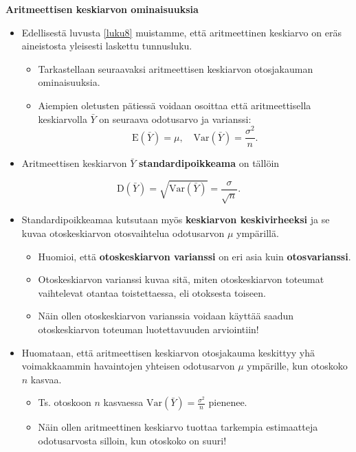 \documentclass[
]{book}
\providecommand{\tightlist}{%
  \setlength{\itemsep}{0pt}\setlength{\parskip}{0pt}}
\begin{document}
\textbf{Aritmeettisen keskiarvon ominaisuuksia}

\begin{itemize}
\tightlist
\item
  Edellisestä luvusta \ref{luku8} muistamme, että aritmeettinen keskiarvo on eräs aineistosta yleisesti laskettu tunnusluku.

  \begin{itemize}
  \tightlist
  \item
    Tarkastellaan seuraavaksi aritmeettisen keskiarvon otosjakauman ominaisuuksia.
  \item
    Aiempien oletusten pätiessä voidaan osoittaa että aritmeettisella keskiarvolla \(\bar{Y}\) on seuraava odotusarvo ja varianssi:
    \[
    \text{E}(\bar{Y}) = \mu,  \quad
    \mathrm{Var}(\bar{Y}) = \frac{\sigma^2}{n}.
    \]
  \end{itemize}
\item
  Aritmeettisen keskiarvon \(\bar{Y}\) \textbf{standardipoikkeama} on tällöin
\end{itemize}

\[
\text{D}(\bar{Y}) = \sqrt{\mathrm{Var}(\bar{Y})} = \frac{\sigma}{\sqrt{n}}.
\]

\begin{itemize}
\tightlist
\item
  Standardipoikkeamaa kutsutaan myös \textbf{keskiarvon keskivirheeksi} ja se kuvaa otoskeskiarvon otosvaihtelua odotusarvon \(\mu\) ympärillä.

  \begin{itemize}
  \tightlist
  \item
    Huomioi, että \textbf{otoskeskiarvon varianssi} on eri asia kuin \textbf{otosvarianssi}.
  \item
    Otoskeskiarvon varianssi kuvaa sitä, miten otoskeskiarvon toteumat vaihtelevat otantaa toistettaessa, eli otoksesta toiseen.
  \item
    Näin ollen otoskeskiarvon varianssia voidaan käyttää saadun otoskeskiarvon toteuman luotettavuuden arviointiin!
  \end{itemize}
\item
  Huomataan, että aritmeettisen keskiarvon otosjakauma keskittyy yhä voimakkaammin havaintojen yhteisen odotusarvon \(\mu\) ympärille, kun otoskoko \(n\) kasvaa.

  \begin{itemize}
  \tightlist
  \item
    Ts. otoskoon \(n\) kasvaessa \(\mathrm{Var}(\bar{Y}) = \frac{\sigma^2}{n}\) pienenee.
  \item
    Näin ollen aritmeettinen keskiarvo tuottaa tarkempia estimaatteja odotusarvosta silloin, kun otoskoko on suuri!
  \end{itemize}
\end{itemize}
\end{document}

